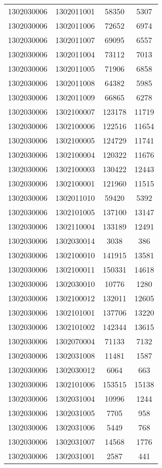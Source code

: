 \begin{longtable}{llcc}
1302030006 & 1302011001 & 58350 & 5307\\
1302030006 & 1302011006 & 72652 & 6974\\
1302030006 & 1302011007 & 69095 & 6557\\
1302030006 & 1302011004 & 73112 & 7013\\
1302030006 & 1302011005 & 71906 & 6858\\
1302030006 & 1302011008 & 64382 & 5985\\
1302030006 & 1302011009 & 66865 & 6278\\
1302030006 & 1302100007 & 123178 & 11719\\
1302030006 & 1302100006 & 122516 & 11654\\
1302030006 & 1302100005 & 124729 & 11741\\
1302030006 & 1302100004 & 120322 & 11676\\
1302030006 & 1302100003 & 130422 & 12443\\
1302030006 & 1302100001 & 121960 & 11515\\
1302030006 & 1302011010 & 59420 & 5392\\
1302030006 & 1302101005 & 137100 & 13147\\
1302030006 & 1302110004 & 133189 & 12491\\
1302030006 & 1302030014 & 3038 & 386\\
1302030006 & 1302100010 & 141915 & 13581\\
1302030006 & 1302100011 & 150331 & 14618\\
1302030006 & 1302030010 & 10776 & 1280\\
1302030006 & 1302100012 & 132011 & 12605\\
1302030006 & 1302101001 & 137706 & 13220\\
1302030006 & 1302101002 & 142344 & 13615\\
1302030006 & 1302070004 & 71133 & 7132\\
1302030006 & 1302031008 & 11481 & 1587\\
1302030006 & 1302030012 & 6064 & 663\\
1302030006 & 1302101006 & 153515 & 15138\\
1302030006 & 1302031004 & 10996 & 1244\\
1302030006 & 1302031005 & 7705 & 958\\
1302030006 & 1302031006 & 5449 & 768\\
1302030006 & 1302031007 & 14568 & 1776\\
1302030006 & 1302031001 & 2587 & 441\\

\end{longtable}
